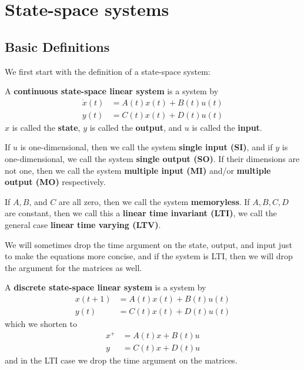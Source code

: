 \chapter{State-space systems}
\section{Basic Definitions}

We first start with the definition of a state-space system:

\begin{definition}
    A \textbf{continuous state-space linear system} is a system by 
    \begin{align*}
        \dot x(t) &= A(t)x(t) + B(t)u(t) \\ 
        y(t) &= C(t)x(t) + D(t)u(t)
    \end{align*}
    $x$ is called the \textbf{state}, $y$ is called the \textbf{output}, and $u$ is called the \textbf{input}.

    If $u$ is one-dimensional, then we call the system \textbf{single input (SI)}, and if $y$ is one-dimensional, we call the system \textbf{single output (SO)}. If their dimensions are not one, then we call the system \textbf{multiple input (MI)} and/or \textbf{multiple output (MO)} respectively.

    If $A, B$, and $C$ are all zero, then we call the system \textbf{memoryless}. If $A, B, C, D$ are constant, then we call this a \textbf{linear time invariant (LTI)}, we call the general case \textbf{linear time varying (LTV)}.
\end{definition}

We will sometimes drop the time argument on the state, output, and input just to make the equations more concise, and if the system is LTI, then we will drop the argument for the matrices as well.

\begin{definition}
    A \textbf{discrete state-space linear system} is a system by 
    \begin{align*}
        x(t + 1) &= A(t)x(t) + B(t)u(t) \\ 
        y(t) &= C(t)x(t) + D(t)u(t)
    \end{align*}
    which we shorten to 
    \begin{align*}
        x^+ &= A(t)x + B(t)u \\ 
        y &= C(t)x + D(t)u
    \end{align*}
    and in the LTI case we drop the time argument on the matrices.
\end{definition}

